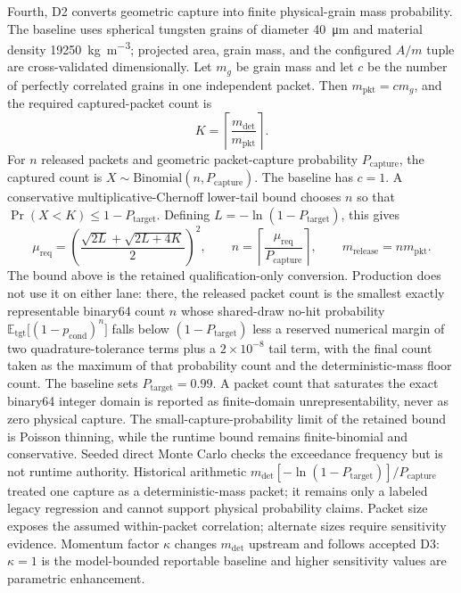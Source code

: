     Fourth, D2 converts geometric capture into finite physical-grain mass probability. The baseline uses spherical tungsten grains of diameter \SI{40}{\micro\metre} and material density \SI{19250}{\kilogram\per\metre\cubed}; projected area, grain mass, and the configured \(A/m\) tuple are cross-validated dimensionally. Let \(m_g\) be grain mass and let \(c\) be the number of perfectly correlated grains in one independent packet. Then \(m_{\mathrm{pkt}}=c m_g\), and the required captured-packet count is
    \begin{equation}
        K=\left\lceil\frac{m_{\mathrm{det}}}{m_{\mathrm{pkt}}}\right\rceil.
        \label{eq:captured_packet_threshold}
    \end{equation}
    For \(n\) released packets and geometric packet-capture probability \(P_{\mathrm{capture}}\), the captured count is \(X\sim\mathrm{Binomial}(n,P_{\mathrm{capture}})\). The baseline has \(c=1\). A conservative multiplicative-Chernoff lower-tail bound chooses \(n\) so that \(\Pr(X<K)\le 1-P_{\mathrm{target}}\). Defining \(L=-\ln(1-P_{\mathrm{target}})\), this gives
    \begin{equation}
        \mu_{\mathrm{req}}=
        \left(\frac{\sqrt{2L}+\sqrt{2L+4K}}{2}\right)^2,
        \qquad
        n=\left\lceil\frac{\mu_{\mathrm{req}}}{P_{\mathrm{capture}}}\right\rceil,
        \qquad
        m_{\mathrm{release}}=n m_{\mathrm{pkt}}.
        \label{eq:mass_floor}
    \end{equation}
    The bound above is the retained qualification-only conversion. Production does not use it on either lane: there, the released packet count is the smallest exactly representable binary64 count \(n\) whose shared-draw no-hit probability \(\mathbb{E}_{\mathrm{tgt}}\bigl[(1-p_{\mathrm{cond}})^{n}\bigr]\) falls below \((1-P_{\mathrm{target}})\) less a reserved numerical margin of two quadrature-tolerance terms plus a \(2\times10^{-8}\) tail term, with the final count taken as the maximum of that probability count and the deterministic-mass floor count. The baseline sets \(P_{\mathrm{target}}=0.99\). A packet count that saturates the exact binary64 integer domain is reported as finite-domain unrepresentability, never as zero physical capture. The small-capture-probability limit of the retained bound is Poisson thinning, while the runtime bound remains finite-binomial and conservative. Seeded direct Monte Carlo checks the exceedance frequency but is not runtime authority. Historical arithmetic \(m_{\mathrm{det}}[-\ln(1-P_{\mathrm{target}})]/P_{\mathrm{capture}}\) treated one capture as a deterministic-mass packet; it remains only a labeled legacy regression and cannot support physical probability claims. Packet size exposes the assumed within-packet correlation; alternate sizes require sensitivity evidence. Momentum factor \(\kappa\) changes \(m_{\mathrm{det}}\) upstream and follows accepted D3: \(\kappa=1\) is the model-bounded reportable baseline and higher sensitivity values are parametric enhancement.

